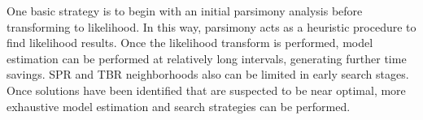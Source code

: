 One basic strategy is to begin with an initial parsimony analysis before transforming to likelihood.  In this way, 
parsimony acts as a heuristic procedure to find likelihood results.  Once the likelihood transform is performed, model estimation can
be performed at relatively long intervals, generating further time savings.  SPR and TBR neighborhoods also can be limited in
early search stages.  Once solutions have been identified that are suspected to be near
optimal, more exhaustive model estimation and search strategies can be performed.